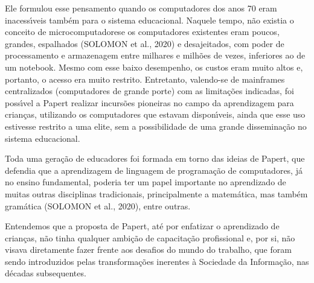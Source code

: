 \documentclass[
12pt,		%
openright,	%
twoside,  %
a4paper,			%
chapter=TITLE,		%
english,			%
french,				%
spanish,			%
brazil				%
]{USPSC-classe/USPSC}
\begin{document}
Ele formulou esse pensamento quando os computadores dos anos 70 eram inacess\'{\i}veis tamb\'em para o sistema educacional. Naquele tempo, n\~ao existia o conceito de \textquotedbl microcomputadores\textquotedbl  e os computadores existentes eram poucos, grandes, espalhados  (SOLOMON et al., 2020) e desajeitados, com poder de processamento e armazenagem entre milhares e milh\~oes de vezes, inferiores ao de um notebook. Mesmo com esse baixo desempenho, os custos eram muito altos e, portanto, o acesso era muito restrito. Entretanto, valendo-se de mainframes centralizados (computadores de grande porte) com as limita\c{c}\~oes indicadas, foi poss\'{\i}vel a Papert realizar incurs\~oes pioneiras no campo da aprendizagem para crian\c{c}as, utilizando os computadores que estavam dispon\'{\i}veis, ainda que esse uso estivesse restrito a uma elite, sem a possibilidade de uma grande dissemina\c{c}\~ao no sistema educacional.

















Toda uma gera\c{c}\~ao de educadores foi formada em torno das ideias de Papert, que defendia que a aprendizagem de linguagem de programa\c{c}\~ao de computadores, j\'a no ensino fundamental, poderia ter um papel importante no aprendizado de muitas outras disciplinas tradicionais, principalmente a matem\'atica, mas tamb\'em gram\'atica (SOLOMON et al., 2020), entre outras.

















Entendemos que a proposta de Papert, at\'e por enfatizar o aprendizado de crian\c{c}as, n\~ao tinha qualquer ambi\c{c}\~ao de capacita\c{c}\~ao profissional e, por si, n\~ao visava diretamente fazer frente aos desafios do \textquotedbl mundo do trabalho\textquotedbl , que foram sendo introduzidos pelas transforma\c{c}\~oes inerentes \`a Sociedade da Informa\c{c}\~ao, nas d\'ecadas subsequentes.
\end{document}
